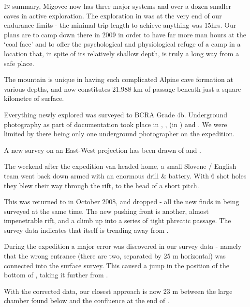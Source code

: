 \thispagestyle{endchapter}

\begin{tcolorbox}

\vspace{80pt}
	\lettrine{I}{n} summary, Migovec now has three major systems and over a dozen smaller
caves in active exploration. The exploration in  was at
the very end of our endurance limits - the minimal trip length to
achieve anything was 15hrs. Our plans are to camp down there in 2009 in
order to have far more man hours at the `coal face' and to offer the
psychological and physiological refuge of a camp in a location that, in
spite of its relatively shallow depth, is truly a long way from a safe
place.

The mountain is unique in having such complicated Alpine cave formation
at various depths, and now constitutes 21.988 km of passage beneath just
a square kilometre of surface.

Everything newly explored was surveyed to BCRA Grade 4b. Underground
photography as part of documentation took place in , ,
 (in ) and . We were limited by
there being only one underground photographer on the expedition.

A new survey on an East-West projection has been drawn of  and
.
 
The weekend after the expedition van headed home, a small Slovene /
English team went back down  armed with an enormous drill \&
battery. With 6 shot holes they blew their way through the rift, to the
head of a short pitch.

This was returned to in October 2008, and dropped - all the new finds in
 being surveyed at the same time. The new pushing front is
another, almost impenetrable rift, and a climb up into a series of tight
phreatic passage. The survey data indicates that  itself is
trending away from .

During the expedition a major error was discovered in our survey data - namely that the wrong  entrance (there are two, separated by 25 m horizontal) was connected into the surface survey. This caused a jump in the position of the bottom of , taking it further from .

With the corrected data, our closest approach is now 23 m between the
large chamber found below  and the confluence at the end of
.

\end{tcolorbox} 
